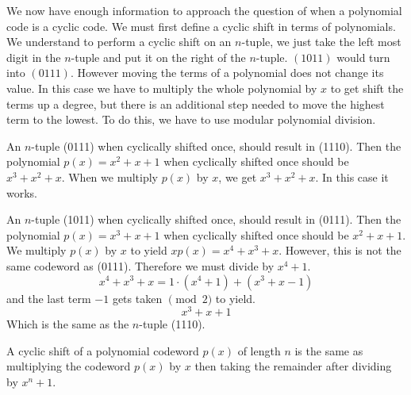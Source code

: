 We now have enough information to approach the question of when a polynomial code is a cyclic code.  We must first define a cyclic shift in terms of polynomials.  We understand to perform a cyclic shift on an $n$-tuple, we just take the left most digit in the $n$-tuple and put it on the right of the $n$-tuple.  $(1011)$ would turn into $(0111)$.  However moving the terms of a polynomial does not change its value.  In this case we have to multiply the whole polynomial by $x$ to get shift the terms up a degree, but there is an additional step needed to move the highest term to the lowest.  To do this, we have to use modular polynomial division.  

\begin{example}{}
An $n$-tuple (0111) when cyclically shifted once, should result in (1110).  Then the polynomial $p(x) = x^2 + x + 1$ when cyclically shifted once should be $x^3 + x^2 + x$.  When we multiply $p(x)$ by $x$, we get $x^3 + x^2 + x$.  In this case it works.

An $n$-tuple (1011) when cyclically shifted once, should result in (0111).  Then the polynomial $p(x) = x^3 + x + 1$ when cyclically shifted once should be $x^2 + x + 1$.  We multiply $p(x)$ by $x$ to yield $xp(x) = x^4 + x^3 + x$.  However, this is not the same codeword as (0111).  Therefore we must divide by $x^4 + 1$.
\[x^4 + x^3 + x = 1\cdot (x^4 + 1) + (x^3 + x - 1)\]
and the last term $-1$ gets taken $\pmod 2$ to yield.
\[x^3 + x + 1\]
Which is the same as the $n$-tuple (1110).
\end{example}

\begin{prop}{}
A cyclic shift of a polynomial codeword $p(x)$ of length $n$ is the same as multiplying the codeword $p(x)$ by $x$ then taking the remainder after dividing by $x^n + 1$.
\end{prop}

